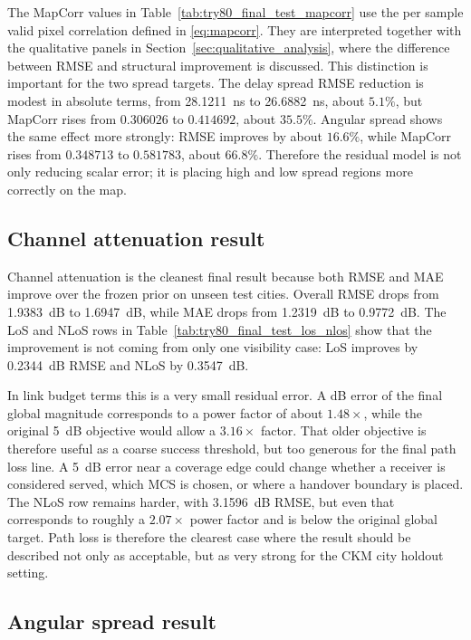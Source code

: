 The MapCorr values in Table~\ref{tab:try80_final_test_mapcorr} use the
per sample valid pixel correlation defined in \eqref{eq:mapcorr}. They are
interpreted together with the qualitative panels in Section~\ref{sec:qualitative_analysis},
where the difference between RMSE and structural improvement is discussed.
This distinction is important for the two spread targets. The delay spread
RMSE reduction is modest in absolute terms, from \SI{28.1211}{ns} to
\SI{26.6882}{ns}, about \(5.1\%\), but MapCorr rises from \(0.306026\) to
\(0.414692\), about \(35.5\%\). Angular spread shows the same effect more
strongly: RMSE improves by about \(16.6\%\), while MapCorr rises from
\(0.348713\) to \(0.581783\), about \(66.8\%\). Therefore the residual model is
not only reducing scalar error; it is placing high and low spread regions more
correctly on the map.

\subsection{Channel attenuation result}

Channel attenuation is the cleanest final result because both RMSE and MAE improve over
the frozen prior on unseen test cities. Overall RMSE drops from
\SI{1.9383}{dB} to \SI{1.6947}{dB}, while MAE drops from \SI{1.2319}{dB} to
\SI{0.9772}{dB}. The LoS and NLoS rows in
Table~\ref{tab:try80_final_test_los_nlos} show that the improvement is not
coming from only one visibility case: LoS improves by \SI{0.2344}{dB} RMSE and
NLoS by \SI{0.3547}{dB}.

In link budget terms this is a very small residual error. A dB error of the
final global magnitude corresponds to a power factor of about \(1.48\times\),
while the original \SI{5}{dB} objective would allow a \(3.16\times\) factor.
That older objective is therefore useful as a coarse success threshold, but
too generous for the final path loss line. A \SI{5}{dB} error near a coverage
edge could change whether a receiver is considered served, which MCS is chosen,
or where a handover boundary is placed. The NLoS row remains harder, with
\SI{3.1596}{dB} RMSE, but even that corresponds to roughly a \(2.07\times\)
power factor and is below the original global target. Path loss is therefore
the clearest case where the result should be described not only as acceptable,
but as very strong for the CKM city holdout setting.

\subsection{Angular spread result}

